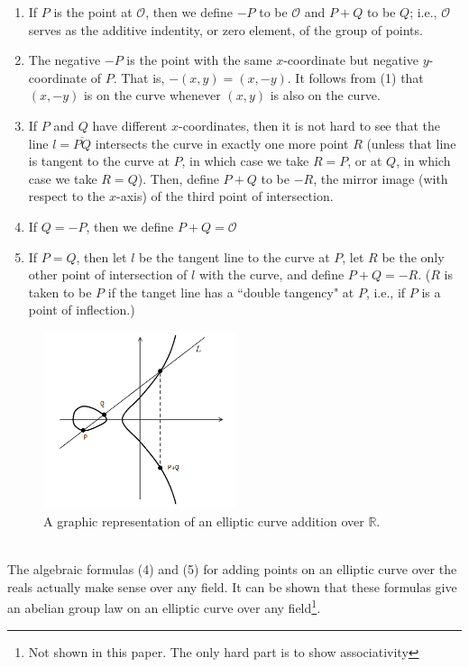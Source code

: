 \documentclass[12pt]{article}
\newcommand{\R}{\mathbb{R}}
\newcommand{\C}{\mathbb{C}}
\newcommand{\Oo}{\mathcal{O}}
\begin{document}
\begin{enumerate}
\item If $P$ is the point at $\Oo$, then we define $-P$ to be $\Oo$ and $P+Q$ to be $Q$; i.e., $\Oo$ serves as the additive indentity, or zero element, of the group of points. 
\item The negative $-P$ is the point with the same $x$-coordinate but negative $y$-coordinate of $P$. That is, $-(x,y) = (x,-y)$. It follows from (1) that $(x,-y)$ is on the curve whenever $(x,y)$ is also on the curve. 
\item If $P$ and $Q$ have different $x$-coordinates, then it is not hard to see that the line $l = \overline{PQ}$ intersects the curve in exactly one more point $R$ (unless that line is tangent to the curve at $P$, in which case we take $R=P$, or at $Q$, in which case we take $R=Q$). Then, define $P+Q$ to be $-R$, the mirror image (with respect to the $x$-axis) of the third point of intersection.
\item If $Q = -P$, then we define $P+Q = \Oo$
\item If $P = Q$, then let $l$ be the tangent line to the curve at $P$, let $R$ be the only other point of intersection of $l$ with the curve, and define $P+Q = -R$. ($R$ is taken to be $P$ if the tanget line has a ``double tangency" at $P$, i.e., if $P$ is a point of inflection.)
\end{enumerate}
 
\begin{figure}
\caption{A graphic representation of an elliptic curve addition over $\R$.}
  \centering
  \includegraphics[width=0.5\textwidth]{ellipticcurve.png}
\end{figure}

\noindent {\bf Elliptic curves over $\C$.}\\

The algebraic formulas (4) and (5) for adding points on an elliptic curve over the reals actually make sense over any field. It can be shown that these formulas give an abelian group law on an elliptic curve over any field\footnote[2]{Not shown in this paper. The only hard part is to show associativity}.  \\
\end{document}
